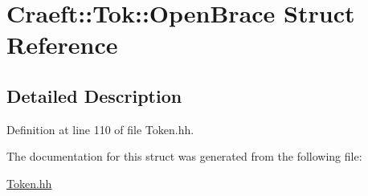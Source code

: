 \hypertarget{struct_craeft_1_1_tok_1_1_open_brace}{}\section{Craeft\+:\+:Tok\+:\+:Open\+Brace Struct Reference}
\label{struct_craeft_1_1_tok_1_1_open_brace}


\subsection{Detailed Description}


Definition at line 110 of file Token.\+hh.



The documentation for this struct was generated from the following file\+:\begin{DoxyCompactItemize}
\item 
\hyperlink{_token_8hh}{Token.\+hh}\end{DoxyCompactItemize}
